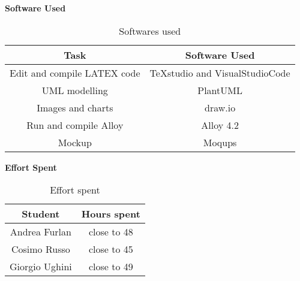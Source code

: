 \begin{flushleft}
\textbf{Software Used}
\end{flushleft}
\begin{table}[htp]
	\centering
		\begin{tabular}{|c|c|}
			\hline
			Task&Software Used\\
			\hline
			Edit and compile LATEX code&TeXstudio and VisualStudioCode\\
			\hline
			UML modelling&PlantUML\\
			\hline
			Images and charts&draw.io\\
			\hline
			Run and compile Alloy&Alloy 4.2\\
			\hline
			Mockup&Moqups\\
			\hline
		\end{tabular}
	\caption{Softwares used} 
\end{table}
\begin{flushleft}
\textbf{Effort Spent}
\end{flushleft}
\begin{table}[htp]
	\centering
		\begin{tabular}{|c|c|}
			\hline
			Student&Hours spent\\
			\hline
			Andrea Furlan&close to 48\\
			\hline
			Cosimo Russo&close to 45\\
			\hline
			Giorgio Ughini&close to 49\\
			\hline
		\end{tabular}
	\caption{Effort spent} 
\end{table}